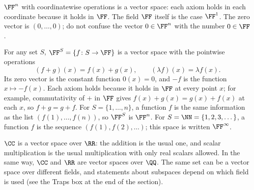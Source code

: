 \documentclass[10pt]{scrartcl}
\begin{document}
\begin{example*}
  $\FF^n$ with coordinatewise operations is a vector space: each axiom holds in each coordinate because it holds in $\FF$. The field $\FF$ itself is the case $\FF^1$. The zero vector is $(0,\dots,0)$; do not confuse the vector $0\in\FF^n$ with the number $0\in\FF$.
\end{example*}

\begin{example*}
  For any set $S$, $\FF^S=\{f\colon S\to\FF\}$ is a vector space with the pointwise operations
  \[
    (f+g)(x)=f(x)+g(x),\qquad (\lambda f)(x)=\lambda f(x).
  \]
  Its zero vector is the constant function $0(x)=0$, and $-f$ is the function $x\mapsto -f(x)$. Each axiom holds because it holds in $\FF$ at every point $x$; for example, commutativity of $+$ in $\FF$ gives $f(x)+g(x)=g(x)+f(x)$ at each $x$, so $f+g=g+f$. For $S=\{1,\dots,n\}$, a function $f$ is the same information as the list $(f(1),\dots,f(n))$, so $\FF^S$ is $\FF^n$. For $S=\NN=\{1,2,3,\dots\}$, a function $f$ is the sequence $(f(1),f(2),\dots)$; this space is written $\FF^\infty$.
\end{example*}

\begin{example*}
  $\CC$ is a vector space over $\RR$: the addition is the usual one, and scalar multiplication is the usual multiplication with only real scalars allowed. In the same way, $\CC$ and $\RR$ are vector spaces over $\QQ$. The same set can be a vector space over different fields, and statements about subspaces depend on which field is used (see the Traps box at the end of the section).
\end{example*}
\end{document}
